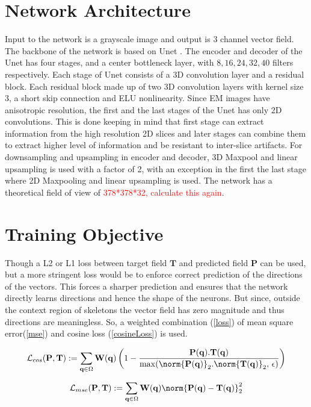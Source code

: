 \section{Network Architecture}
Input to the network is a grayscale image and output is 3 channel vector field.
The backbone of the network is based on Unet \cite{ronneberger2015}. The encoder and decoder of the Unet has four stages, and a center bottleneck layer, with $8, 16, 24, 32, 40$ filters respectively. Each stage of Unet consists of a 3D convolution layer and a residual block. Each residual block made up of two 3D convolution layers with kernel size 3, a short skip connection and ELU nonlinearity. Since EM images have anisotropic resolution, the first and the last stages of the Unet has only 2D convolutions. This is done keeping in mind that first stage can extract information from the high resolution 2D slices and later stages can combine them to extract higher level of information and be resistant to inter-slice artifacts. For downsampling and upsampling in encoder and decoder, 3D Maxpool and linear upsampling is used with a factor of 2, with an exception in the first the last stage where 2D Maxpooling and linear upsampling is used. The network has a theoretical field of view of \textcolor{red}{378*378*32, calculate this again}.  

\section{Training Objective}
Though a L2 or L1 loss between target field $\mathbf{T}$ and predicted field $\mathbf{P}$ can be used, but a more stringent loss would be to enforce correct prediction of the directions of the vectors. This forces a sharper prediction and ensures that the network directly learns directions and hence the shape of the neurons. But since, outside the context region of skeletons the vector field has zero magnitude and thus directions are meaningless. So, a weighted combination (\autoref{loss}) of mean square error(\autoref{mse}) and cosine loss (\autoref{cosineLoss}) is used.

\begin{equation}\label{cosineLoss}
\mathcal{L}_{cos}(\mathbf{P}, \mathbf{T}) := \sum_{\mathbf{q} \in \Omega} \mathbf{W}(\mathbf{q})\left( 1 - \frac{\mathbf{P}(\mathbf{q}).\mathbf{T}(\mathbf{q})}{\max(\norm{\mathbf{P}(\mathbf{q})}_2.\norm{\mathbf{T}(\mathbf{q})}_2,\,\epsilon)} \right)
\end{equation}

\begin{equation} \label{mse}
\mathcal{L}_{mse}(\mathbf{P}, \mathbf{T}) := \sum_{\mathbf{q} \in \Omega} \mathbf{W}(\mathbf{q}) \norm{\mathbf{P}(\mathbf{q}) - \mathbf{T}(\mathbf{q})}_2^2
\end{equation}

